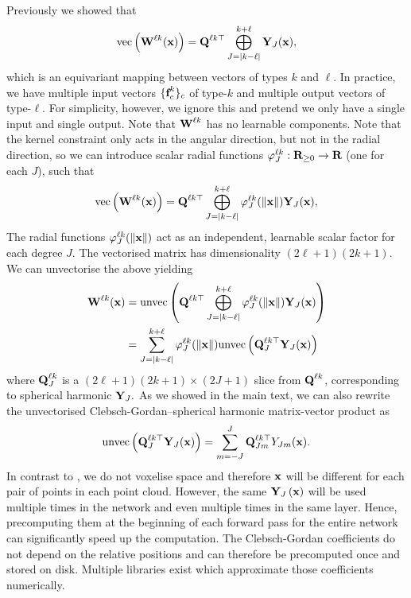 Previously we showed that 
\begin{align}
    \text{vec} \left ( \textbf{W}^{\ell k}(\textbf{x}) \right ) = \textbf{Q}^{\ell k \top} \bigoplus_{J = |k - \ell|}^{k + \ell} \textbf{Y}_J(\textbf{x}),
\end{align}
which is an equivariant mapping between vectors of types $k$ and $\ell$. In practice, we have multiple input vectors $\{\textbf{f}_c^k\}_c$ of type-$k$ and multiple output vectors of type-$\ell$. For simplicity, however, we ignore this and pretend we only have a single input and single output. Note that $\textbf{W}^{\ell k}$ has no learnable components. Note that the kernel constraint only acts in the angular direction, but not in the radial direction, so we can introduce scalar radial functions $\varphi_{J}^{\ell k}: \textbf{R}_{\geq 0} \to \textbf{R}$ (one for each $J$), such that 
\begin{align}
    \text{vec} \left ( \textbf{W}^{\ell k}(\textbf{x}) \right ) = \textbf{Q}^{\ell k \top} \bigoplus_{J = |k - \ell|}^{k + \ell} \varphi_J^{\ell k}(\|\textbf{x}\|) \textbf{Y}_J(\textbf{x}),
\end{align}
The radial functions $\varphi_{J}^{\ell k}(\|\textbf{x}\|)$ act as an independent, learnable scalar factor for each degree $J$. The vectorised matrix has dimensionality $(2\ell+1)(2k+1)$. We can unvectorise the above yielding 
\begin{align}
    \textbf{W}^{\ell k}(\textbf{x}) &= \text{unvec}\left(\textbf{Q}^{\ell k \top} \bigoplus_{J = |k - \ell|}^{k + \ell} \varphi_J^{\ell k}(\|\textbf{x}\|) \textbf{Y}_J(\textbf{x})\right) \\
    &= \sum_{J = |k - \ell|}^{k + \ell} \varphi_J^{\ell k}(\|\textbf{x}\|) \text{unvec}\left( \textbf{Q}_J^{\ell k \top}  \textbf{Y}_J(\textbf{x}) \right )
\end{align}
where $\textbf{Q}_J^{\ell k}$ is a $(2\ell+1)(2k+1) \times (2J+1)$ slice from $\textbf{Q}^{\ell k}$, corresponding to spherical harmonic $\textbf{Y}_J.$ As we showed in the main text, we can also rewrite the unvectorised Clebsch-Gordan--spherical harmonic matrix-vector product as
\begin{align}
    \text{unvec}\left( \textbf{Q}_J^{\ell k \top}  \textbf{Y}_J(\textbf{x}) \right ) = \sum_{m=-J}^J \textbf{Q}_{Jm}^{\ell k \top}  Y_{Jm}(\textbf{x}).
\end{align}
In contrast to \citet{WeilerGWBC18}, we do not voxelise space and therefore $\textbf{x}$ will be different for each pair of points in each point cloud. However, the same $\textbf{Y}_J\left(\textbf{x}\right)$ will be used multiple times in the network and even multiple times in the same layer. Hence, precomputing them at the beginning of each forward pass for the entire network can significantly speed up the computation. The Clebsch-Gordan coefficients do not depend on the relative positions and can therefore be precomputed once and stored on disk. Multiple libraries exist which approximate those coefficients numerically.


